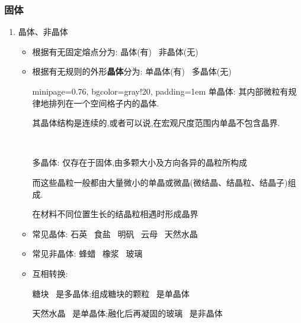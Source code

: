 \documentclass{article}
\begin{document}
\subsubsection{固体}
\begin{enumerate}
    \item 晶体、非晶体
          \begin{itemize}
              \item 根据有无固定熔点分为: 晶体(有) \, 非晶体(无)
              \item 根据有无规则的外形\textbf{晶体}分为: 单晶体(有) \, 多晶体(无)

                    \vspace{-1em}
                    \hspace{-0.9em}\begin{adjustbox}{minipage=0.76\linewidth, bgcolor=gray!20, padding=1em}
                        \small %
                        单晶体: 其内部微粒有规律地排列在一个空间格子内的晶体.

                        \hspace{3.8em}其晶体结构是连续的,或者可以说,在宏观尺度范围内单晶不包含晶界.

                        \,

                        多晶体: 仅存在于固体,由多颗大小及方向各异的晶粒所构成

                        \hspace{3.8em}而这些晶粒一般都由大量微小的单晶或微晶(微结晶、结晶粒、结晶子)组成.

                        \hspace{3.8em}在材料不同位置生长的结晶粒相遇时形成晶界
                    \end{adjustbox}
                    \vspace{-1em}

              \item 常见晶体: 石英 \, 食盐 \, 明矾 \, 云母 \, 天然水晶
              \item 常见非晶体: 蜂蜡 \, 橡浆 \, 玻璃
              \item 互相转换:

                    \hspace{4.8em}糖块 \, 是多晶体;组成糖块的颗粒 \, 是单晶体

                    \hspace{4.8em}天然水晶 \, 是单晶体;融化后再凝固的玻璃 \, 是非晶体
          \end{itemize}


\end{enumerate}
\end{document}
